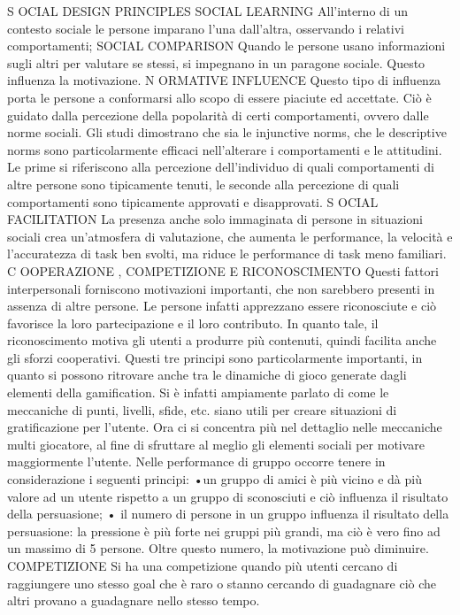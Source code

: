  S OCIAL DESIGN PRINCIPLES
SOCIAL LEARNING All'interno di un contesto sociale le persone imparano l'una dall'altra, osservando i relativi comportamenti;
SOCIAL COMPARISON Quando le persone usano informazioni sugli altri per valutare se stessi, si impegnano in un paragone sociale. Questo influenza la motivazione.
N ORMATIVE INFLUENCE Questo tipo di influenza porta le persone a conformarsi allo scopo di essere piaciute ed accettate. Ciò è guidato dalla percezione della popolarità di certi comportamenti, ovvero dalle norme sociali. Gli studi dimostrano che sia le injunctive norms, che le descriptive norms sono particolarmente efficaci nell'alterare i comportamenti e le attitudini. Le prime si riferiscono alla percezione dell'individuo di quali comportamenti di altre persone sono tipicamente tenuti, le seconde alla percezione di quali comportamenti sono tipicamente approvati e disapprovati.
S OCIAL FACILITATION La presenza anche solo immaginata di persone in situazioni sociali crea un'atmosfera di valutazione, che aumenta le performance, la velocità e l'accuratezza di task ben svolti, ma riduce le performance di task meno familiari.
C OOPERAZIONE , COMPETIZIONE E RICONOSCIMENTO Questi fattori interpersonali forniscono motivazioni importanti, che non sarebbero presenti in assenza di altre persone. Le persone infatti apprezzano essere riconosciute e ciò favorisce la loro partecipazione e il loro contributo. In quanto tale, il riconoscimento motiva gli utenti a produrre più contenuti, quindi facilita anche gli sforzi cooperativi.
Questi tre principi sono particolarmente importanti, in quanto si possono ritrovare anche tra le dinamiche di gioco generate dagli elementi della gamification.
Si è infatti ampiamente parlato di come le meccaniche di punti, livelli, sfide, etc. siano utili per creare situazioni di gratificazione per l'utente. Ora ci si concentra più nel dettaglio nelle meccaniche multi giocatore, al fine di sfruttare al meglio gli elementi sociali per motivare maggiormente l'utente.
Nelle performance di gruppo occorre tenere in considerazione i seguenti principi:
•un gruppo di amici è più vicino e dà più valore ad un utente rispetto a un gruppo di sconosciuti e ciò influenza il risultato della persuasione;
• il numero di persone in un gruppo influenza il risultato della persuasione: la pressione è più forte nei gruppi più grandi, ma ciò è vero fino ad un massimo di 5 persone. Oltre questo numero, la motivazione può diminuire.
COMPETIZIONE Si ha una competizione quando più utenti cercano di raggiungere uno stesso goal che è raro o stanno cercando di guadagnare ciò che altri provano a guadagnare nello stesso  tempo.
